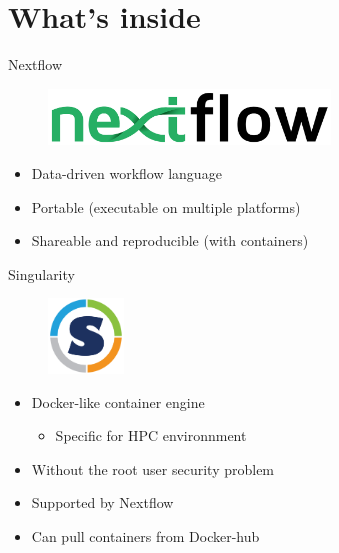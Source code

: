 \documentclass[usepdftitle=false]{beamer}
\begin{document}
\section{What's inside}

\begin{frame}{Nextflow}
	\begin{figure}
		\includegraphics[height=1.5cm]{pictures/nextflow.png}
	\end{figure}
	\begin{itemize}
		\item Data-driven workflow language
		\pause
		\item Portable (executable on multiple platforms)
		\pause
		\item Shareable and reproducible (with containers)
	\end{itemize}
	\vfill
\end{frame}

\begin{frame}{Singularity}
	\begin{figure}
		\includegraphics[height=2cm]{pictures/Singularity}
	\end{figure}
	\begin{itemize}
		\item Docker-like container engine
		\begin{itemize}
			\item Specific for HPC environnment
		\end{itemize}
		\pause
		\item Without the root user security problem
		\pause
		\item Supported by Nextflow
		\pause
		\item Can pull containers from Docker-hub
	\end{itemize}
\end{frame}
\end{document}
